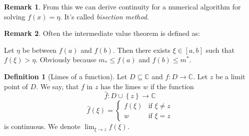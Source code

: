 \documentclass[a4paper,landscape,twocolumn]{article}
\theoremstyle{definition}
\newtheorem{defi}{Definition}
\newtheorem{rem}{Remark}
\newcommand\set[1]{\left\{#1\right\}}
\begin{document}
\begin{rem}
  From this we can derive continuity for a numerical algorithm for solving $f(x) = \eta$.
  It's called \emph{bisection method}.
\end{rem}
\begin{rem}
  Often the intermediate value theorem is defined as:

  Let $\eta$ be between $f(a)$ and $f(b)$. Then there exists $\xi \in [a, b]$
  such that $f(\xi) > \eta$. Obviously because $m_* \leq f(a)$ and $f(b) \leq m^*$.
\end{rem}
\begin{defi}[Limes of a function]
  Let $D \subseteq \mathbb C$ and $f: D \to \mathbb C$. Let $z$ be a limit point of $D$.
  We say, that $f$ in $z$ has the limes $w$ if the function
  \[
    \hat{f}: D \cup \set{z} \to \mathbb C
  \] \[
    \hat{f}(\xi) = \begin{cases}
      f(\xi) & \text{if } \xi \neq z \\
      w & \text{if } \xi = z
    \end{cases}
  \]
  is continuous. We denote $\lim_{\xi \to z} f(\xi)$.
\end{defi}
\end{document}
